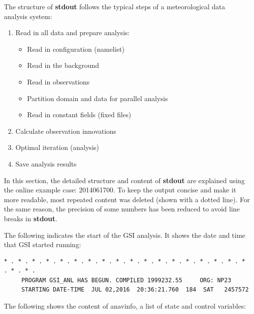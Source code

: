 The structure of \textbf{stdout} follows the typical steps of a meteorological data analysis system:

\begin{enumerate}
\item Read in all data and prepare analysis:
\begin{itemize}
\item Read in configuration (namelist)
\item Read in the background
\item Read in observations
\item Partition domain and data for parallel analysis
\item Read in constant fields (fixed files)
\end{itemize}
\item Calculate observation innovations
\item Optimal iteration (analysis)
\item Save analysis results
\end{enumerate}

In this section, the detailed structure and content of \textbf{stdout} are explained using the online example case: 2014061700. To keep the output concise and make it more readable, most repeated content was deleted (shown with a dotted line). For the same reason, the precision of some numbers has been reduced to avoid line breaks in \textbf{stdout}.

The following indicates the start of the GSI analysis. It shows the date and time that GSI started running:

\begin{scriptsize}
\begin{verbatim}
* . * . * . * . * . * . * . * . * . * . * . * . * . * . * . * . * . * . * . * .
     PROGRAM GSI_ANL HAS BEGUN. COMPILED 1999232.55     ORG: NP23
     STARTING DATE-TIME  JUL 02,2016  20:36:21.760  184  SAT   2457572
\end{verbatim}
\end{scriptsize}

The following shows the content of anavinfo, a list of state and control variables:

